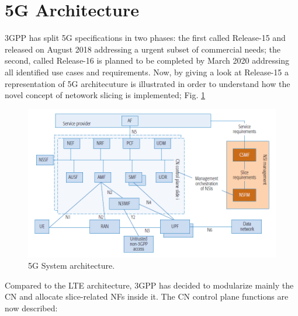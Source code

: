 \documentclass[a4paper,12pt]{report} %
\begin{document}
\section{5G Architecture}
3GPP has split 5G specifications in
two phases: the first called Release-15 and released on August 2018 addressing
a urgent subset of commercial
needs; the second, called Release-16 is planned to be completed by March
2020 addressing all identified use cases and
requirements. 
Now, by giving a look at Release-15 a representation of 5G architecuture is illustrated in order to understand how the novel concept of netowork slicing is implemented; Fig. \ref{archite}
\begin{figure}[h]
\centering
\includegraphics[scale=.57]{pics/5g_architecture.PNG}
\caption{5G System architecture. \cite{etsi2018gs} \cite{kaloxylos2018survey}}
\label{archite}
\end{figure}
Compared to the LTE architecture, 3GPP
has decided to modularize mainly the CN
and allocate slice-related NFs inside it. The CN
control plane functions are now described:
\end{document}
